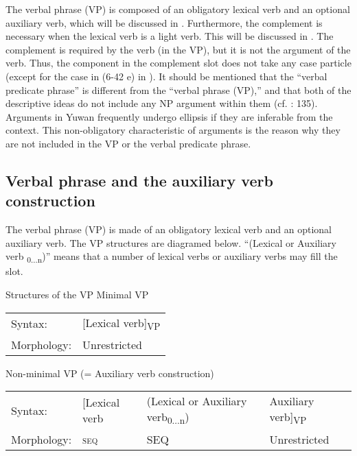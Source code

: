 The verbal phrase (VP) is composed of an obligatory lexical verb and an optional auxiliary verb, which will be discussed in . Furthermore, the complement is necessary when the lexical verb is a light verb. This will be discussed in . The complement is required by the verb (in the VP), but it is not the argument of the verb. Thus, the component in the complement slot does not take any case particle (except for the case in (6-42 e) in ). It should be mentioned that the “verbal predicate phrase” is different from the “verbal phrase (VP),” and that both of the descriptive ideas do not include any NP argument within them (cf. \citealt{Andrews2007}: 135). Arguments in Yuwan frequently undergo ellipsis if they are inferable from the context. This non-obligatory characteristic of arguments is the reason why they are not included in the VP or the verbal predicate phrase.

\subsection{Verbal phrase and the auxiliary verb construction}\label{sec:9.1.1}

The verbal phrase (VP) is made of an obligatory lexical verb and an optional auxiliary verb. The VP structures are diagramed below. “(Lexical or Auxiliary verb\textsubscript{ 0...n})” means that a number of lexical verbs or auxiliary verbs may fill the slot.

\ea   Structures of the VP \label{ex:9.3}
  \ea Minimal VP\\
  \begin{tabular}{@{}ll@{}}
  Syntax: & [Lexical verb]\textsubscript{VP}\\
  Morphology: & Unrestricted\\
  \end{tabular}
  \ex Non-minimal VP (= Auxiliary verb construction)\\
  \begin{tabular}{@{}llll@{}}
  Syntax: & [Lexical verb & (Lexical or Auxiliary verb\textsubscript{0...n}) & Auxiliary verb]\textsubscript{VP}\\
  Morphology: & \textsc{seq} & SEQ & Unrestricted
  \end{tabular}
  \z
\z

